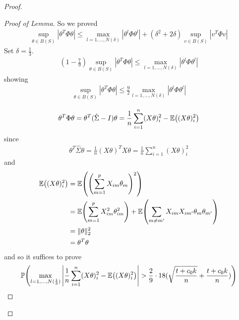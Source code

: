 \begin{proof}
\begin{proof}[Proof of Lemma]
    So we proved
    \begin{align}
      \label{eq:161}
      \sup_{\theta \in B(S)} | \theta^{T} \Phi \theta| \leq \max_{l =
        1, \dots, N(\delta)} |\theta^{l} \Phi \theta^{l}| +
      (\delta^{2} + 2 \delta) \sup_{v \in B(S)} |v^{T} \Phi v|
    \end{align}
    Set $\delta = \frac{1}{3}$.
    \begin{align}
      \label{eq:162}
      (1 - \frac{7}{9}) \sup_{\theta \in B(S)} | \theta^{T} \Phi
      \theta | \leq \max_{l = 1, \dots, N(\delta)} | \theta^{l} \Phi
      \theta^{l} |
    \end{align}
    showing
    \begin{align}
      \label{eq:163}
      \sup_{\theta \in B(S)} | \theta^{T} \Phi \theta | \leq
      \frac{9}{2} \max_{l = 1, \dots, N(\delta)} | \theta^{l} \Phi
      \theta^{l} |
    \end{align}

    \begin{align}
      \label{eq:164}
      \theta^{T} \Phi \theta = \theta^{T} (\hat \Sigma - I) \theta =
      \frac{1}{n} \sum_{i=1}^{n} (X \theta)_{i}^{2} - \E{(X \theta)_{i}^{2}}
    \end{align} since
    \begin{align}
      \label{eq:165}
      \theta^{T} \hat \Sigma \theta = \frac{1}{n} (X \theta)^{T} X
      \theta = \frac{1}{n} \sum_{i=1}^{n} (X \theta)_{i}^{2}
    \end{align} and
    \begin{align}
      \label{eq:166}
      \E{(X \theta)_{i}^{2}} &= \E{\left(\sum_{m=1}^{p} X_{im}
          \theta_{m} \right)^{2}} \\
      &= \E{\sum_{m=1}^{p} X_{im}^{2} \theta_{im}^{2}}  + \E{\sum_{m
          \neq m'} X_{im} X_{im'} \theta_{m} \theta_{m'}} \\
      &= \| \theta \|_{2}^{2} \\
      &= \theta^{T} \theta
    \end{align} and so it suffices to prove
    \begin{align}
      \label{eq:167}
      \Prob{\max_{l=1, \dots, N(\frac{1}{3})} \left| \frac{1}{n}
          \sum_{i=1}^{n} (X \theta)_{i}^{2} - \E{(X \theta)_{i}^{2}}
        \right| > \frac{2}{9} \cdot 18  (\sqrt{\frac{t + c_{0} k}{n}}
        + \frac{t + c_{0} k}{n})}
    \end{align}
  \end{proof}
\end{proof}

